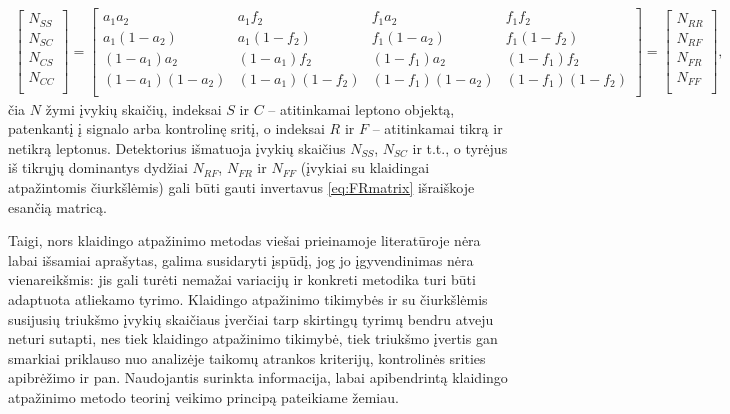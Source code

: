 \documentclass[a4paper, 12pt, oneside]{article}
\newlength\q
\begin{document}
\begin{align}
\label{eq:FRmatrix}
	\begin{bmatrix}
		N_{SS} \\		
		N_{SC} \\
		N_{CS} \\
		N_{CC} \\
	\end{bmatrix}
	=
	\begin{bmatrix}
		a_1a_2 & a_1f_2 & f_1a_2 & f_1f_2 \\
		a_1(1-a_2) & a_1(1-f_2) & f_1(1-a_2) & f_1(1-f_2) \\
		(1-a_1)a_2 & (1-a_1)f_2 & (1-f_1)a_2 & (1-f_1)f_2 \\
		(1-a_1)(1-a_2) & (1-a_1)(1-f_2) & (1-f_1)(1-a_2) & (1-f_1)(1-f_2) \\
	\end{bmatrix}
	=
	\begin{bmatrix}
		N_{RR} \\
		N_{RF} \\
		N_{FR} \\
		N_{FF} \\
	\end{bmatrix}
	\! ,
\end{align}
čia $N$ žymi įvykių skaičių, indeksai $S$ ir $C$ -- atitinkamai leptono objektą, patenkantį į signalo arba kontrolinę sritį,
o indeksai $R$ ir $F$ -- atitinkamai tikrą ir netikrą leptonus.
Detektorius išmatuoja įvykių skaičius $N_{SS}$, $N_{SC}$ ir t.t., o tyrėjus iš tikrųjų dominantys dydžiai $N_{RF}$, $N_{FR}$ ir
$N_{FF}$ (įvykiai su klaidingai atpažintomis čiurkšlėmis) gali būti gauti invertavus \eqref{eq:FRmatrix} išraiškoje esančią matricą.

Taigi, nors klaidingo atpažinimo metodas viešai prieinamoje literatūroje nėra labai išsamiai aprašytas, galima susidaryti įspūdį, jog
jo įgyvendinimas nėra vienareikšmis: jis gali turėti nemažai variacijų ir konkreti metodika turi būti adaptuota atliekamo tyrimo.
Klaidingo atpažinimo tikimybės ir su čiurkšlėmis susijusių triukšmo įvykių skaičiaus įverčiai tarp skirtingų tyrimų bendru atveju neturi
sutapti, nes tiek klaidingo atpažinimo tikimybė, tiek triukšmo įvertis gan smarkiai priklauso nuo analizėje taikomų atrankos kriterijų,
kontrolinės srities apibrėžimo ir pan.
Naudojantis surinkta informacija, labai apibendrintą klaidingo atpažinimo metodo teorinį veikimo principą pateikiame žemiau.
\end{document}
